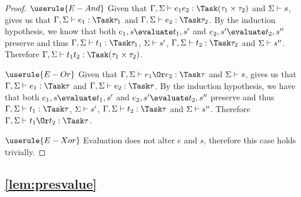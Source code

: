 \begin{proof}
  \case
    {$\userule{E-And}$}
    {Given that $\Gamma,\Sigma\infers e_1\And e_2:\Task(\tau_1\times\tau_2)$ and $\Sigma\vdash s$,  gives us that $\Gamma,\Sigma\infers e_1:\Task\tau_1$ and $\Gamma,\Sigma\infers e_2:\Task\tau_2$.
    By the induction hypothesis, we know that both $e_1,s\evaluate t_1,s'$ and $e_2,s'\evaluate t_2,s''$ preserve and thus $\Gamma,\Sigma\infers t_1:\Task\tau_1$, $\Sigma\vdash s'$, $\Gamma,\Sigma\infers t_2:\Task\tau_2$ and $\Sigma\vdash s''$.
    Therefore $\Gamma,\Sigma\infers t_1\And t_2:\Task(\tau_1\times\tau_2)$.}

  \case
    {$\userule{E-Or}$}
    {Given that $\Gamma,\Sigma\infers e_1\Or e_2:\Task\tau$ and $\Sigma\vdash s$,  gives us that $\Gamma,\Sigma\infers e_1:\Task\tau$ and $\Gamma,\Sigma\infers e_2:\Task\tau$.
    By the induction hypothesis, we have that both $e_1,s\evaluate t_1,s'$ and $e_2,s'\evaluate t_2,s''$ preserve and thus $\Gamma,\Sigma\infers t_1:\Task\tau$, $\Sigma\vdash s'$, $\Gamma,\Sigma\infers t_2:\Task\tau$ and $\Sigma\vdash s''$.
    Therefore $\Gamma,\Sigma\infers t_1\Or t_2:\Task\tau$.}

  \case
    {$\userule{E-Xor}$}
    {Evaluation does not alter $e$ and $s$, therefore this case holds trivially.}

\end{proof}



\subsection{\cref{lem:presvalue}}

